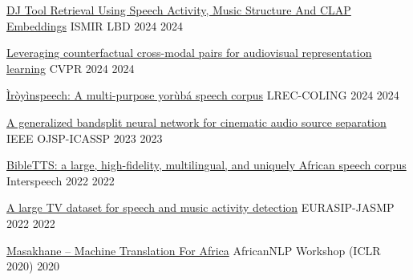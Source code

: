 
\begin{cvhonors}

  \cvhonor
    {\href{https://arxiv.org/pdf/2411.12209}{DJ Tool Retrieval Using Speech Activity, Music Structure And CLAP Embeddings}} %
    {ISMIR LBD 2024} %
    {} %
    {2024} %

  \cvhonor
    {\href{https://openaccess.thecvf.com/content/CVPR2024/papers/Singh_Looking_Similar_Sounding_Different_Leveraging_Counterfactual_Cross-Modal_Pairs_for_Audiovisual_CVPR_2024_paper.pdf}{Leveraging counterfactual cross-modal pairs for audiovisual representation learning}} %
    {CVPR 2024} %
    {} %
    {2024} %

  \cvhonor
    {\href{https://aclanthology.org/2024.lrec-main.812.pdf}{Ìròyìnspeech: A multi-purpose yorùbá speech corpus}} %
    {LREC-COLING 2024} %
    {} %
    {2024} %


  \cvhonor
    {\href{https://ieeexplore.ieee.org/stamp/stamp.jsp?arnumber=10342812}{A generalized bandsplit neural network for cinematic audio source separation}} %
    {IEEE OJSP-ICASSP 2023} %
    {} %
    {2023} %

  \cvhonor
    {\href{https://arxiv.org/pdf/2207.03546}{BibleTTS: a large, high-fidelity, multilingual, and uniquely African speech corpus}} %
    {Interspeech 2022} %
    {} %
    {2022} %

  \cvhonor
    {\href{https://link.springer.com/article/10.1186/s13636-022-00253-8}{A large TV dataset for speech and music activity detection}} %
    {EURASIP-JASMP 2022} %
    {} %
    {2022} %

  \cvhonor
    {\href{https://arxiv.org/pdf/2003.11529}{Masakhane -- Machine Translation For Africa}} %
    {AfricanNLP Workshop (ICLR 2020)} %
    {} %
    {2020} %


\end{cvhonors}
